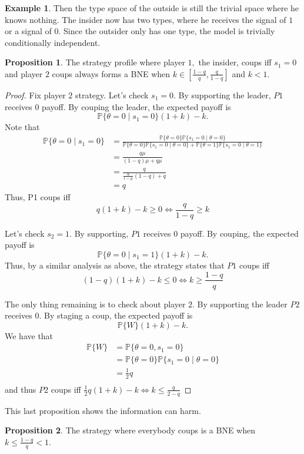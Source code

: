 \documentclass[10pt, oneside]{article}
\newcommand{\bbP}{\mathbb{P}}
\theoremstyle{definition}
\newtheorem{exmp}{Example}[section]
\newtheorem{prop}{Proposition}
\begin{document}
\begin{exmp}
    Then the type space of the outside is still the trivial space where he knows nothing. The insider now has two types, where he receives the signal of $1$ or a signal of $0.$ Since the outsider only has one type, the model is trivially conditionally independent.
    \begin{prop}
        The strategy profile where player $1,$ the insider, coups iff $s_1 = 0$ and player $2$ coups always forms a BNE when $k \in [\frac{1-q}{q}, \frac{q}{1-q}]$ and $k < 1.$
    \end{prop}
    \begin{proof}
        Fix player $2$ strategy. Let's check $s_1 = 0.$ By supporting the leader, $P1$ receives $0$ payoff. By couping the leader, the expected payoff is 
        \[\bbP\{\theta = 0 \mid s_1 = 0\}(1+ k) - k.\] Note that 
        \begin{align*}
        \bbP\{\theta = 0 \mid s_1 = 0\} &= \frac{\bbP\{\theta = 0\}\bbP\{s_1 = 0 \mid \theta = 0\}}{\bbP\{\theta = 0\}\bbP\{s_1 = 0 \mid \theta = 0\} + \bbP\{\theta = 1\}\bbP\{s_1 = 0 \mid \theta = 1\}}    \\
        &= \frac{q\mu}{(1-q)\mu + q\mu}\\
        &= \frac{q}{\frac{u}{1-\mu}(1-q) + q}\\
        &= q
        \end{align*}
        Thus, P1 coups iff 
        \[q(1 + k) - k \geq 0 \iff \frac{q}{1-q} \geq k \]

        Let's check $s_2 = 1.$ By supporting, $P1$ receives $0$ payoff. By couping, the expected payoff is 
        \[\bbP\{\theta = 0 \mid s_1 = 1\}(1+ k) - k.\] Thus, by a similar analysis as above, the strategy states that $P1$ coups iff
        \[(1-q)(1+k) - k \leq 0 \iff k\geq \frac{1-q}{q}\]

        The only thing remaining is to check about player $2.$ By supporting the leader $P2$ receives $0.$ By staging a coup, the expected payoff is 
        \[\bbP\{W\}(1 + k) - k.\] We have that 
        \begin{align*}
            \bbP\{W\} &= \bbP\{\theta = 0, s_1= 0\}\\
            &= \bbP\{\theta = 0\}\bbP\{s_1 = 0 \mid \theta = 0\}\\
            &= \frac{1}{2}q\\
        \end{align*}
        and thus $P2$ coups iff $\frac{1}{2}q(1 + k) - k \iff k \leq \frac{q}{2 - q}$
    \end{proof}
    This last proposition shows the information can harm.
    \begin{prop}
        The strategy where everybody coups is a BNE when $k \leq \frac{1-q}{q} < 1.$
    \end{prop}
\end{exmp}
\end{document}

